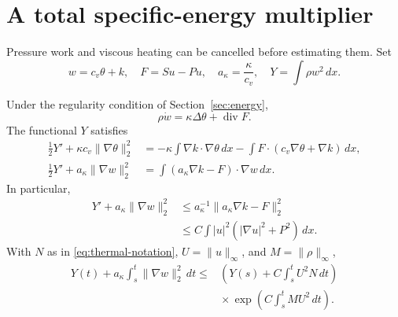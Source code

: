 \documentclass[10pt,twoside]{article}
\newcommand{\dd}{\,dx}
\newcommand{\dt}{\,dt}
\newcommand{\Div}{\operatorname{div}}
\newcommand{\norm}[2]{\lVert#1\rVert_{#2}}
\begin{document}
\section{A total specific-energy multiplier}\label{sec:specific}
Pressure work and viscous heating can be cancelled before estimating
them. Set
\begin{equation}\label{eq:specific-definitions}
 w=c_v\theta+k,\quad F=Su-Pu,\quad a_\kappa=\frac{\kappa}{c_v},
 \quad Y=\int\rho w^2\dd.
\end{equation}
\begin{proposition}\label{prop:specific}
Under the regularity condition of Section~\ref{sec:energy},
\begin{equation}\label{eq:specific-equation}
 \rho\dot w=\kappa\Delta\theta+\Div F.
\end{equation}
The functional $Y$ satisfies
\begin{align}
 \frac12Y'+\kappa c_v\norm{\nabla\theta}{2}^2
 &=-\kappa\int\nabla k\cdot\nabla\theta\dd
       -\int F\cdot(c_v\nabla\theta+\nabla k)\dd,
       \label{eq:specific-theta}\\
 \frac12Y'+a_\kappa\norm{\nabla w}{2}^2
 &=\int(a_\kappa\nabla k-F)\cdot\nabla w\dd.
       \label{eq:specific-w}
\end{align}
In particular,
\begin{equation}\label{eq:specific-bound}
 \begin{split}
 Y'+a_\kappa\norm{\nabla w}{2}^2
 &\le a_\kappa^{-1}\norm{a_\kappa\nabla k-F}{2}^2\\
 &\le C\int|u|^2(|\nabla u|^2+P^2)\dd .
 \end{split}
\end{equation}
With $N$ as in \eqref{eq:thermal-notation},
$U=\norm{u}{\infty}$, and $M=\norm{\rho}{\infty}$,
\begin{equation}\label{eq:specific-gronwall}
 \begin{split}
 Y(t)+a_\kappa\int_s^t\norm{\nabla w}{2}^2\dt
 \le{}&\left(Y(s)+C\int_s^tU^2N\dt\right)\\
 &{}\times\exp\left(C\int_s^tMU^2\dt\right).
 \end{split}
\end{equation}
\end{proposition}
\end{document}
